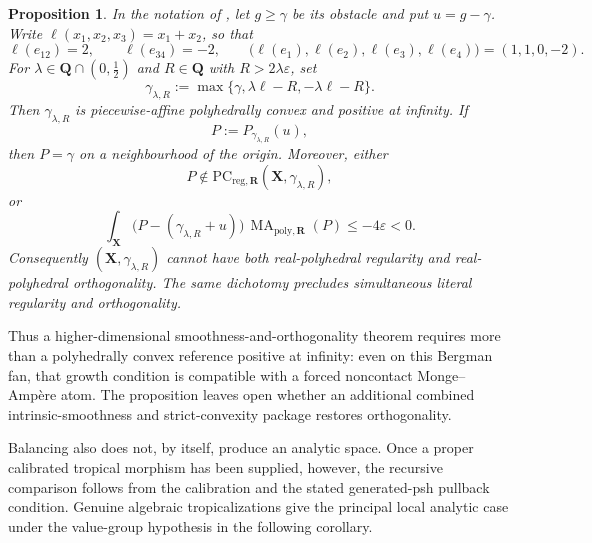 \documentclass[11pt,a4paper]{article}
\newtheorem{proposition}[proposition]{Proposition}
\theoremstyle{definition}
\theoremstyle{remark}
\DeclareMathOperator{\MA}{MA}
\begin{document}
\begin{proposition}\label{prop:frontier-polyhedral-bergman-positive-infinity-obstruction}
In the notation of \cite[Example~6.24 and Claim~6.25]{BMPS26}, let
\(g\geq\gamma\) be its obstacle and put \(u=g-\gamma\).  Write
\(\ell(x_1,x_2,x_3)=x_1+x_2\), so that
\[
 \ell(e_{12})=2,
 \qquad
 \ell(e_{34})=-2,
 \qquad
 \bigl(\ell(e_1),\ell(e_2),\ell(e_3),\ell(e_4)\bigr)
   =(1,1,0,-2).
\]
For \(\lambda\in\mathbf Q\cap(0,\tfrac12)\) and
\(R\in\mathbf Q\) with \(R>2\lambda\varepsilon\), set
\[
 \gamma_{\lambda,R}
   :=\max\{\gamma,\lambda\ell-R,-\lambda\ell-R\}.
\]
Then \(\gamma_{\lambda,R}\) is piecewise-affine polyhedrally convex and
positive at infinity.  If
\[
 P:=P_{\gamma_{\lambda,R}}(u),
\]
then \(P=\gamma\) on a neighbourhood of the origin.  Moreover, either
\[
 P\notin
 \mathrm{PC}_{\mathrm{reg},\mathbf R}
     (\mathbf X,\gamma_{\lambda,R}),
\]
or
\[
 \int_{\mathbf X}
 \bigl(P-(\gamma_{\lambda,R}+u)\bigr)\,
 \MA_{\mathrm{poly},\mathbf R}(P)
 \leq -4\varepsilon<0.
\]
Consequently \((\mathbf X,\gamma_{\lambda,R})\) cannot have both
real-polyhedral regularity and real-polyhedral orthogonality.  The same
dichotomy precludes simultaneous literal regularity and orthogonality.
\end{proposition}



Thus a higher-dimensional smoothness-and-orthogonality theorem requires
more than a polyhedrally convex reference positive at infinity: even on
this Bergman fan, that growth condition is compatible with a forced
noncontact Monge--Amp\`ere atom.  The proposition leaves open whether an
additional combined intrinsic-smoothness and strict-convexity package restores
orthogonality.

Balancing also does not, by itself, produce an analytic space.  Once a
proper calibrated tropical morphism has been supplied, however, the
recursive comparison follows from the calibration and the stated
generated-psh pullback condition.  Genuine algebraic tropicalizations give
the principal local analytic case under the value-group hypothesis in the
following corollary.







\providecommand{\an}{\mathrm{an}}
\end{document}
